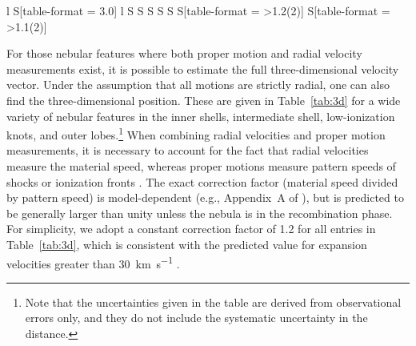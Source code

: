 \documentclass[useAMS, usenatbib]{mnras}
\begin{document}
\begin{table}
\begin{tabular}{
    l %
    S[table-format = 3.0] %
    l %
    S %
    S %
    S %
    S %
    S %
    S[table-format = >1.2(2)] %
    S[table-format = >1.1(2)] %
    }
    \bottomrule
  \end{tabular}
\end{table}

For those nebular features where both proper motion and radial velocity measurements exist,
it is possible to estimate the full three-dimensional velocity vector.
Under the assumption that all motions are strictly radial,
one can also find the three-dimensional position.
These are given in Table~\ref{tab:3d} for a wide variety of nebular features
in the inner shells, intermediate shell, low-ionization knots, and outer lobes.\footnote{
  Note that the uncertainties given in the table are derived from observational errors only,
  and they do not include the systematic uncertainty in the distance.
}
When combining radial velocities and proper motion measurements,
it is necessary to account for the fact that radial velocities measure the material speed,
whereas proper motions measure pattern speeds of shocks or ionization fronts \citep{Mellema:2004a}. 
The exact correction factor (material speed divided by pattern speed)
is model-dependent (e.g., Appendix~A of \citealp{ODell:2009c}),
but is predicted to be generally larger than unity
\citetext{see Fig.~8 of \citealp{Jacob:2013a}}
unless the nebula is in the recombination phase.
For simplicity, we adopt a constant correction factor of 1.2 for all entries in Table~\ref{tab:3d},
which is consistent with the predicted value for expansion velocities greater than \SI{30}{km.s^{-1}}
\citetext{see Fig.~3 of \citealp{Schonberner:2019a}}.
\end{document}
